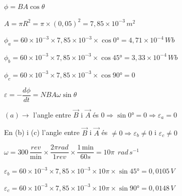 \begin{solapartat}

 $\phi = BA\cos\theta$

\smallskip
{} $A = \pi R^2 = \pi\times(0,05)^2 = 7,85\times 10^{-3}\,m^2$

\smallskip
{} $\phi_a = 60\times 10^{-3}\times 7,85\times 10^{-3}\times\cos 0° = 4,71\times 10^{-4}\,Wb$

\smallskip
{} $\phi_b = 60\times 10^{-3}\times 7,85\times 10^{-3}\times\cos 45° = 3,33\times 10^{-4}\,Wb$

\smallskip
{} $\phi_c = 60\times 10^{-3}\times 7,85\times 10^{-3}\times\cos 90° = 0$
\end{solapartat}

\begin{solapartat}
 $\varepsilon = -\dfrac{d\phi}{dt} = NBA\omega\sin\theta$

\smallskip
{} $(a) \rightarrow$ l'angle entre $\vec{B}$ i $\vec{A}$ és $0 \Rightarrow \sin 0° = 0 \Rightarrow \varepsilon_a = 0$

\smallskip
{} En (b) i (c) l'angle entre $\vec{B}$ i $\vec{A}$ és $\neq 0 \Rightarrow \varepsilon_b \neq 0$ i $\varepsilon_c \neq 0$

\smallskip
{} $\omega = 300\,\dfrac{rev}{\mathrm{min}}\times\dfrac{2\pi rad}{1rev}\times\dfrac{1\,\mathrm{min}}{60s} = 10\pi\ \ rad\,s^{-1}$

\smallskip
{} $\varepsilon_b = 60\times 10^{-3}\times 7,85\times 10^{-3}\times 10\pi\times\sin 45° = 0,0105\,V$

\smallskip
{} $\varepsilon_c = 60\times 10^{-3}\times 7,85\times 10^{-3}\times 10\pi\times\sin 90° = 0,0148\,V$
\end{solapartat}
